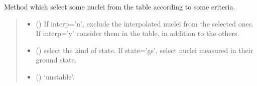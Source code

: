 \documentclass[letterpaper,10pt,english]{sphinxmanual}
\begin{document}
\begin{fulllineitems}
\begin{fulllineitems}
\end{fulllineitems}


\begin{fulllineitems}
\label{\detokenize{source/api/setup_masses:nucleardatapy.setup_masses.SetupMasses.select}}
\pysigstartsignatures
{}
\pysigstopsignatures
\sphinxAtStartPar
Method which select some nuclei from the table according to some criteria.
\begin{quote}\begin{description}
\begin{itemize}
\item {} 
\sphinxAtStartPar
{} (\sphinxstyleliteralemphasis{\sphinxupquote{, }}) \textendash{} If interp=’n’, exclude the interpolated nuclei from the selected ones.         If interp=’y’ consider them in the table, in addition to the others.

\item {} 
\sphinxAtStartPar
{} (\sphinxstyleliteralemphasis{\sphinxupquote{, }}) \textendash{} select the kind of state. If state=’gs’, select nuclei measured in their ground state.

\item {} 
\sphinxAtStartPar
{} (\sphinxstyleliteralemphasis{\sphinxupquote{, }}) \textendash{} ‘unstable’.


\end{itemize}
\end{description}
\end{quote}
\end{fulllineitems}
\end{fulllineitems}
\end{document}
